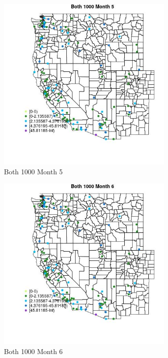 \begin{figure} 
\centering  
\includegraphics[width=0.77\textwidth]{Code_Outputs/Report_ML_input_PM25_Step4_part_e_de_duplicated_aves_MapObsMo5Both_1000.jpg} 
\caption{\label{fig:Report_ML_input_PM25_Step4_part_e_de_duplicated_avesMapObsMo5Both_1000}Both 1000 Month 5} 
\end{figure} 
 

\clearpage 

\begin{figure} 
\centering  
\includegraphics[width=0.77\textwidth]{Code_Outputs/Report_ML_input_PM25_Step4_part_e_de_duplicated_aves_MapObsMo6Both_1000.jpg} 
\caption{\label{fig:Report_ML_input_PM25_Step4_part_e_de_duplicated_avesMapObsMo6Both_1000}Both 1000 Month 6} 
\end{figure} 
 

